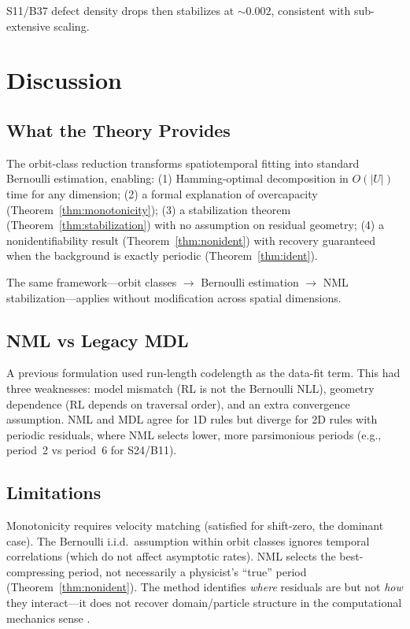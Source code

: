\documentclass[letterpaper]{article}
\theoremstyle{definition}
\theoremstyle{remark}
\begin{document}
S11/B37 defect density drops then stabilizes at ${\sim}0.002$, consistent with sub-extensive scaling.

\section{Discussion}

\subsection{What the Theory Provides}

The orbit-class reduction transforms spatiotemporal fitting into standard Bernoulli estimation, enabling:
(1) Hamming-optimal decomposition in $O(|U|)$ time for any dimension;
(2) a formal explanation of overcapacity (Theorem~\ref{thm:monotonicity});
(3) a stabilization theorem (Theorem~\ref{thm:stabilization}) with no assumption on residual geometry;
(4) a nonidentifiability result (Theorem~\ref{thm:nonident}) with recovery guaranteed when the background is exactly periodic (Theorem~\ref{thm:ident}).

The same framework---orbit classes $\to$ Bernoulli estimation $\to$ NML stabilization---applies without modification across spatial dimensions.

\subsection{NML vs Legacy MDL}

A previous formulation used run-length codelength as the data-fit term.
This had three weaknesses: model mismatch (RL is not the Bernoulli NLL), geometry dependence (RL depends on traversal order), and an extra convergence assumption.
NML and MDL agree for 1D rules but diverge for 2D rules with periodic residuals, where NML selects lower, more parsimonious periods (e.g., period~2 vs period~6 for S24/B11).

\subsection{Limitations}

Monotonicity requires velocity matching (satisfied for shift-zero, the dominant case).
The Bernoulli i.i.d.\ assumption within orbit classes ignores temporal correlations (which do not affect asymptotic rates).
NML selects the best-compressing period, not necessarily a physicist's ``true'' period (Theorem~\ref{thm:nonident}).
The method identifies \emph{where} residuals are but not \emph{how} they interact---it does not recover domain/particle structure in the computational mechanics sense \citep{crutchfield1997}.
\end{document}
